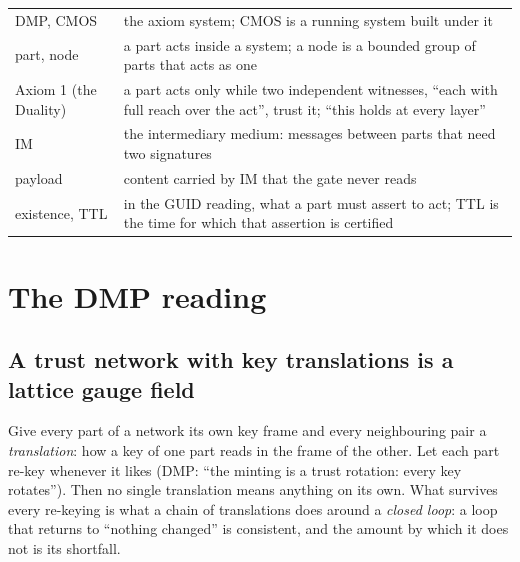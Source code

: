 \documentclass[11pt,a4paper]{article}
\begin{document}
\begin{table}[h]
\begin{tabularx}{\linewidth}{@{}>{\raggedright\arraybackslash}p{3.3cm}L@{}}
\midrule
DMP, CMOS & the axiom system; CMOS is a running system built under it \\
part, node & a part acts inside a system; a node is a bounded group of parts that acts as one \\
Axiom 1 (the Duality) & a part acts only while two independent witnesses, ``each with full reach over the act'', trust it; ``this holds at
every layer'' \\
IM & the intermediary medium: messages between parts that need two signatures \\
payload & content carried by IM that the gate never reads \\
existence, TTL & in the GUID reading, what a part must assert to act; TTL is the time for which that assertion is certified \\
\bottomrule
\end{tabularx}
\end{table}

\section{The DMP reading}\label{sec:dmp}

\subsection{A trust network with key translations is a lattice gauge field}

Give every part of a network its own key frame and every neighbouring pair a \emph{translation}: how a key of one part reads in the frame
of the other. Let each part re-key whenever it likes (DMP: ``the minting is a trust rotation: every key rotates''). Then no single
translation means anything on its own. What survives every re-keying is what a chain of translations does around a \emph{closed loop}: a
loop that returns to ``nothing changed'' is consistent, and the amount by which it does not is its shortfall.
\end{document}
